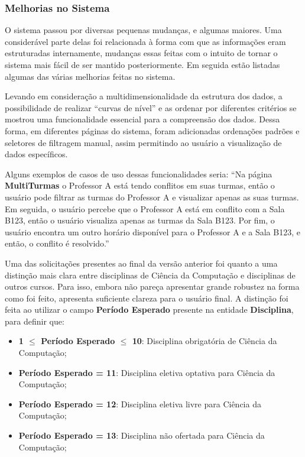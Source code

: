 \subsubsection{Melhorias no Sistema}

O sistema passou por diversas pequenas mudanças, e algumas maiores. Uma considerável parte delas foi relacionada à forma com que as informações eram estruturadas internamente, mudanças essas feitas com o intuito de tornar o sistema mais fácil de ser mantido posteriormente. Em seguida estão listadas algumas das várias melhorias feitas no sistema.


Levando em consideração a multidimensionalidade da estrutura dos dados, a possibilidade de realizar ``curvas de nível'' e as ordenar por diferentes critérios se mostrou uma funcionalidade essencial para a compreensão dos dados. Dessa forma, em diferentes páginas do sistema, foram adicionadas ordenações padrões e seletores de filtragem manual, assim permitindo ao usuário a visualização de dados específicos.

Alguns exemplos de casos de uso dessas funcionalidades seria: ``Na página \textbf{MultiTurmas} o Professor A está tendo conflitos em suas turmas, então o usuário pode filtrar as turmas do Professor A e visualizar apenas as suas turmas. Em seguida, o usuário percebe que o Professor A está em conflito com a Sala B123, então o usuário visualiza apenas as turmas da Sala B123. Por fim, o usuário encontra um outro horário disponível para o Professor A e a Sala B123, e então, o conflito é resolvido.''

Uma das solicitações presentes ao final da versão anterior foi quanto a uma distinção mais clara entre disciplinas de Ciência da Computação e disciplinas de outros cursos. Para isso, embora não pareça apresentar grande robustez na forma como foi feito, apresenta suficiente clareza para o usuário final. A distinção foi feita ao utilizar o campo \textbf{Período Esperado} presente na entidade \textbf{Disciplina}, para definir que:

\begin{itemize}
  \item \textbf{1 $\leq$ Período Esperado $\leq$ 10}: Disciplina obrigatória de Ciência da Computação;
  \item \textbf{Período Esperado = 11}: Disciplina eletiva optativa para Ciência da Computação;
  \item \textbf{Período Esperado = 12}: Disciplina eletiva livre para Ciência da Computação;
  \item \textbf{Período Esperado = 13}: Disciplina não ofertada para Ciência da Computação;
\end{itemize}

